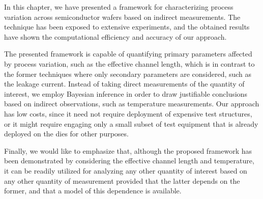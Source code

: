 In this chapter, we have presented a framework for characterizing process
variation across semiconductor wafers based on indirect measurements. The
technique has been exposed to extensive experiments, and the obtained results
have shown the computational efficiency and accuracy of our approach.

The presented framework is capable of quantifying primary parameters affected by
process variation, such as the effective channel length, which is in contrast to
the former techniques where only secondary parameters are considered, such as
the leakage current. Instead of taking direct measurements of the quantity of
interest, we employ Bayesian inference in order to draw justifiable conclusions
based on indirect observations, such as temperature measurements. Our approach
has low costs, since it need not require deployment of expensive test
structures, or it might require engaging only a small subset of test equipment
that is already deployed on the dies for other purposes.

Finally, we would like to emphasize that, although the proposed framework has
been demonstrated by considering the effective channel length and temperature,
it can be readily utilized for analyzing any other quantity of interest based on
any other quantity of measurement provided that the latter depends on the
former, and that a model of this dependence is available.
